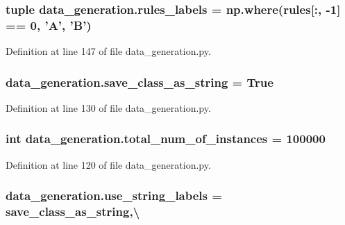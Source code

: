 \hypertarget{namespacedata__generation_aa245bd201fe9810d8a8d8d615c4915ee}{
\subsubsection[{rules\+\_\+labels}]{\setlength{\rightskip}{0pt plus 5cm}tuple data\+\_\+generation.\+rules\+\_\+labels = np.\+where({\bf rules}\mbox{[}\+:, -\/1\mbox{]} == 0, 'A', 'B')}}\label{namespacedata__generation_aa245bd201fe9810d8a8d8d615c4915ee}


Definition at line 147 of file data\+\_\+generation.\+py.

\hypertarget{namespacedata__generation_ae8c6a78af0481f316865220c829b86d2}{
\subsubsection[{save\+\_\+class\+\_\+as\+\_\+string}]{\setlength{\rightskip}{0pt plus 5cm}data\+\_\+generation.\+save\+\_\+class\+\_\+as\+\_\+string = True}}\label{namespacedata__generation_ae8c6a78af0481f316865220c829b86d2}


Definition at line 130 of file data\+\_\+generation.\+py.

\hypertarget{namespacedata__generation_a963ce4f506a2b3bb6acb94915445f716}{
\subsubsection[{total\+\_\+num\+\_\+of\+\_\+instances}]{\setlength{\rightskip}{0pt plus 5cm}int data\+\_\+generation.\+total\+\_\+num\+\_\+of\+\_\+instances = 100000}}\label{namespacedata__generation_a963ce4f506a2b3bb6acb94915445f716}


Definition at line 120 of file data\+\_\+generation.\+py.

\hypertarget{namespacedata__generation_a65cdb95b35877149855b39ef209ada8e}{
\subsubsection[{use\+\_\+string\+\_\+labels}]{\setlength{\rightskip}{0pt plus 5cm}data\+\_\+generation.\+use\+\_\+string\+\_\+labels = {\bf save\+\_\+class\+\_\+as\+\_\+string},\textbackslash{}}}\label{namespacedata__generation_a65cdb95b35877149855b39ef209ada8e}


